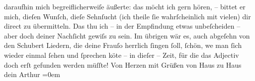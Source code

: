\begin{ledgroupsized}[t]{13cm}
               daraufhin mich begreiflicherweiſe äußerte: das möcht ich gern hören, – bittet er
               mich,  dieſen Wunſch, dieſe Sehnſucht {\pb}(ich theile ſie
               wahrſcheinlich mit vielen) dir direct zu übermitteln. Das thu ich – in der Empfindung
               etwas unbeſcheiden – aber doch deiner Nachſicht gewiſs zu sein. Im übrigen wär es,
               auch abgeſehn von den Schubert Liedern, die deine
                  Frauſo herrlich ſingen ſoll, ſchön, we{\geminationn} man ſich wieder einmal ſehen und ſprechen kö{\geminationn}te – in dieſer – Zeit, für die das Adjectiv doch erſt
               gefunden werden müſſte!\pend
           \pstart
           Von Herzen mit Grüßen von Haus zu Haus{\\[\baselineskip]}dein \spacefill\mbox{Arthur}\pend
           \leftskip=0em{}          \endnumbering{}\end{ledgroupsized}  \newcommand{\dateiname}{L02203}\newcommand{\titel}{Arthur Schnitzler an Hermann Bahr, 9. 2. 1915}\newcommand{\editorInnen}{ Kurt Ifkovits,  Martin Anton Müller}
            \footnotesize
\begin{ledgroupsized}[t]{11.5cm}
\end{ledgroupsized}
         
      